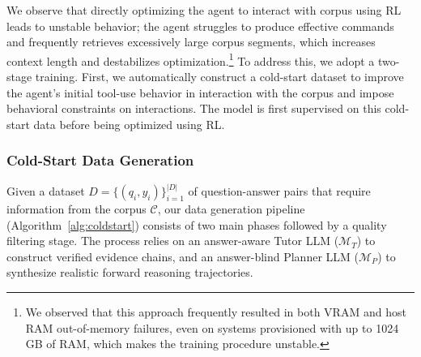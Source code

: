 \documentclass{article} %
\begin{document}
We observe that directly optimizing the agent to interact with corpus using RL leads to unstable behavior; the agent struggles to produce effective commands and frequently retrieves excessively large corpus segments, which increases context length and destabilizes optimization.\footnote{We observed that this approach frequently resulted in both VRAM and host RAM out-of-memory failures, even on systems provisioned with up to 1024\,GB of RAM, which makes the training procedure unstable.} To address this, we adopt a two-stage training. First, we automatically construct a cold-start dataset to improve the agent’s initial tool-use behavior in interaction with the corpus and impose behavioral constraints on interactions. The model is first supervised on this cold-start data before being optimized using RL.

\subsubsection{Cold-Start Data Generation}

Given a dataset $D=\{(q_i, y_i)\}_{i=1}^{|D|}$  of question-answer pairs that require information from the corpus $\mathcal{C}$, our data generation pipeline (Algorithm~\ref{alg:coldstart}) consists of two main phases followed by a quality filtering stage. The process relies on an answer-aware Tutor LLM ($\mathcal{M}_{T}$) to construct verified evidence chains, and an answer-blind Planner LLM ($\mathcal{M}_{P}$) to synthesize realistic forward reasoning trajectories.
\end{document}

